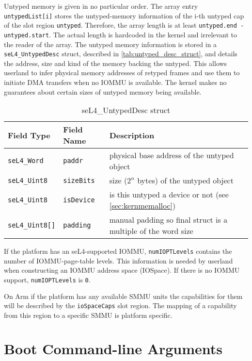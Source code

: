 Untyped memory is given in no particular order. The array entry
\texttt{untypedList[i]} stores the untyped-memory information of
the i-th untyped cap of the slot region \texttt{untyped}. Therefore, the array
length is at least \texttt{untyped.end - untyped.start}. The actual length is
hardcoded in the kernel and irrelevant to the reader of the array. The untyped
memory information is stored in a \texttt{seL4\_UntypedDesc} struct, described
in \autoref{tab:untyped_desc_struct}, and details the address, size and kind of
the memory backing the untyped. This allows userland to infer physical memory
addresses of retyped frames and use them to initiate DMA transfers when no
IOMMU is available. The kernel makes no guarantees about certain sizes of untyped
memory being available.

\begin{table}[htb]
  \begin{center}
    \caption{seL4\_UntypedDesc struct}
    \label{tab:untyped_desc_struct}
    \begin{tabular}{lll}
      \toprule
      Field Type & Field Name & Description \\
      \midrule
      \texttt{seL4\_Word}  & \texttt{paddr}    & physical base address of the untyped object \\
      \texttt{seL4\_Uint8} & \texttt{sizeBits} & size ($2^n$ bytes) of the untyped object \\
      \texttt{seL4\_Uint8} & \texttt{isDevice} & is this untyped a device or not (see \autoref{sec:kernmemalloc}) \\
      \texttt{seL4\_Uint8[]} & \texttt{padding} & manual padding so final struct is a multiple of the word size \\
      \bottomrule
    \end{tabular}
  \end{center}
\end{table}

If the platform has an seL4-supported IOMMU, \texttt{numIOPTLevels} contains
the number of IOMMU-page-table levels. This information is needed by userland
when constructing an IOMMU address space (IOSpace). If there is no IOMMU
support, \texttt{numIOPTLevels} is \texttt{0}.

On Arm if the platform has any available SMMU units the capabilities for them
will be described by the \texttt{ioSpaceCaps} slot region. The mapping of a
capability from this region to a specific SMMU is platform specific.

\ifxeightsix
\section{Boot Command-line Arguments}

